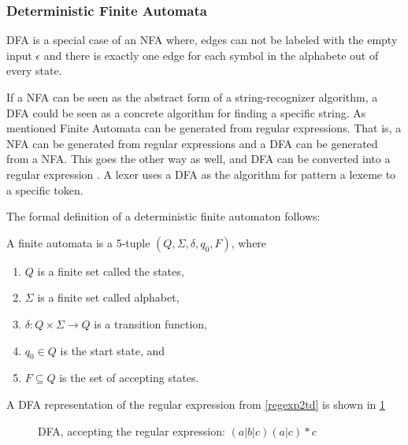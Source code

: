 \subsubsection{Deterministic Finite Automata}
DFA is a special case of an NFA where, edges can not be labeled with the empty input $\epsilon$ and there is exactly one edge for each symbol in the alphabete out of every state.

If a NFA can be seen as the abstract form of a string-recognizer algorithm, a
DFA could be seen as a concrete algorithm for finding a specific string. As
mentioned Finite Automata can be generated from regular expressions. That is, a
NFA can be generated from regular expressions and a DFA can be generated from a
NFA. This goes the other way as well, and DFA can be converted into a regular
expression \cite{Aho2006}. A lexer uses a DFA as the algorithm for pattern a
lexeme to a specific token.

The formal definition of a deterministic finite automaton follows:
\begin{definition} \label{finiteAutomataDef}
A finite automata is a 5-tuple $(Q, \Sigma, \delta, q_0, F)$, where
\begin{enumerate}
  \item $Q$ is a finite set called the states,
  \item $\Sigma$ is a finite set called alphabet,
  \item $\delta: Q \times \Sigma \to Q$ is a transition function,
  \item $q_0 \in Q$ is the start state, and
  \item $F \subseteq Q$ is the set of accepting states.
\end{enumerate} 
\end{definition}

\begin{example} \label{regexp2dfa}
A DFA representation of the regular expression from \cref{regexp2td} is shown in \cref{fig:dfa}
\end{example}
\begin{figure}[!h]
  \centering
  \caption{DFA, accepting the regular expression: $(a|b|c)(a|c)* c$
  \label{fig:dfa}}
\end{figure}

 
